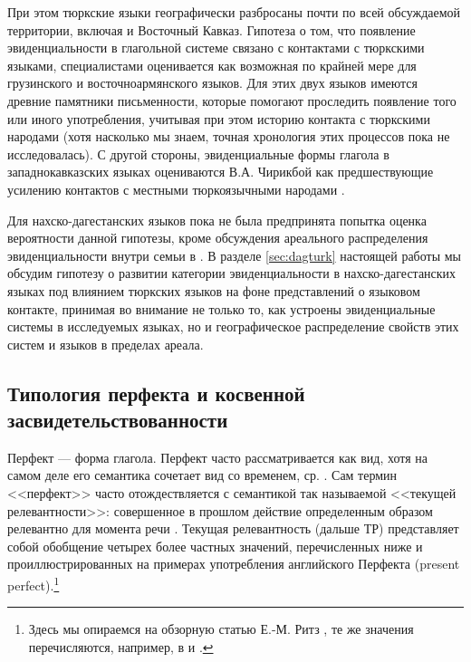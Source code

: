 При этом тюркские языки географически разбросаны почти по всей обсуждаемой территории, включая и Восточный Кавказ. Гипотеза о том, что появление эвиденциальности в глагольной системе связано с контактами с тюркскими языками, специалистами оценивается как возможная по крайней мере для грузинского \citep[297--298]{boeder2000} и восточноармянского \citep[415]{kozintseva2000} языков. Для этих двух языков имеются древние памятники письменности, которые помогают проследить появление того или иного употребления, учитывая при этом историю контакта с тюркскими народами (хотя насколько мы знаем, точная хронология этих процессов пока не исследовалась). С другой стороны, эвиденциальные формы глагола в западнокавказских языках оцениваются В.А. Чирикбой как предшествующие усилению контактов с местными тюркоязычными народами \citep[265--267]{chirikba2003}.
\par Для нахско-дагестанских языков пока не была предпринята попытка оценка вероятности данной гипотезы, кроме обсуждения ареального распределения эвиденциальности внутри семьи в \citep{verhees2018pstgu}. В разделе \ref{sec:dagturk} настоящей работы мы обсудим гипотезу о развитии категории эвиденциальности в нахско-дагестанских языках под влиянием тюркских языков на фоне представлений о языковом контакте, принимая во внимание не только то, как устроены эвиденциальные системы в исследуемых языках, но и географическое распределение свойств этих систем и языков в пределах ареала.

\subsection{Типология перфекта и косвенной засвидетельствованности} \label{sec:pftyp}

\color{black}
Перфект --- форма глагола. Перфект часто рассматривается как вид, хотя на самом деле его семантика сочетает вид со временем, ср. \citep[6]{comrie1976}. Сам термин <<перфект>> часто отождествляется с семантикой так называемой <<текущей релевантности>>: совершенное в прошлом действие определенным образом релевантно для момента речи \citep[24--25]{comrie1985}. Текущая релевантность (дальше ТР) представляет собой обобщение четырех более частных значений, перечисленных ниже и проиллюстрированных на примерах употребления английского Перфекта (present perfect).\footnote{Здесь мы опираемся на обзорную статью Е.-М. Ритз \citep[882--884]{ritz2012}, те же значения перечисляются, например, в \citep{comrie1976} и \citep{mccawley1971}.}


